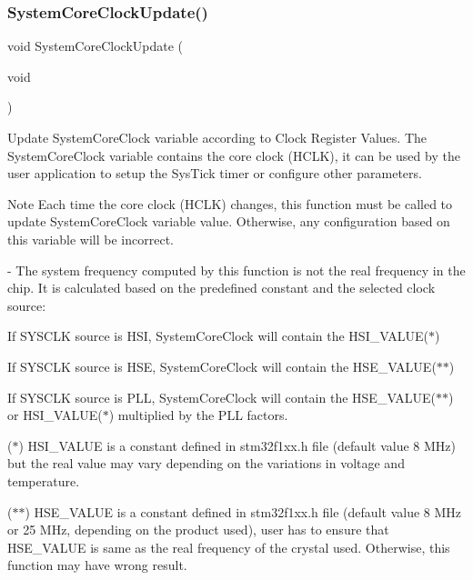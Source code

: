 \subsubsection{System\+Core\+Clock\+Update()}
{\footnotesize\ttfamily void System\+Core\+Clock\+Update (\begin{DoxyParamCaption}\item[{void}]{ }\end{DoxyParamCaption})}



Update System\+Core\+Clock variable according to Clock Register Values. The System\+Core\+Clock variable contains the core clock (H\+C\+LK), it can be used by the user application to setup the Sys\+Tick timer or configure other parameters. 

\begin{DoxyNote}{Note}
Each time the core clock (H\+C\+LK) changes, this function must be called to update System\+Core\+Clock variable value. Otherwise, any configuration based on this variable will be incorrect.

-\/ The system frequency computed by this function is not the real frequency in the chip. It is calculated based on the predefined constant and the selected clock source\+:
\end{DoxyNote}

\begin{DoxyItemize}
\item If S\+Y\+S\+C\+LK source is H\+SI, System\+Core\+Clock will contain the H\+S\+I\+\_\+\+V\+A\+L\+U\+E($\ast$)
\item If S\+Y\+S\+C\+LK source is H\+SE, System\+Core\+Clock will contain the H\+S\+E\+\_\+\+V\+A\+L\+U\+E($\ast$$\ast$)
\item If S\+Y\+S\+C\+LK source is P\+LL, System\+Core\+Clock will contain the H\+S\+E\+\_\+\+V\+A\+L\+U\+E($\ast$$\ast$) or H\+S\+I\+\_\+\+V\+A\+L\+U\+E($\ast$) multiplied by the P\+LL factors.
\end{DoxyItemize}

($\ast$) H\+S\+I\+\_\+\+V\+A\+L\+UE is a constant defined in stm32f1xx.\+h file (default value 8 M\+Hz) but the real value may vary depending on the variations in voltage and temperature.

($\ast$$\ast$) H\+S\+E\+\_\+\+V\+A\+L\+UE is a constant defined in stm32f1xx.\+h file (default value 8 M\+Hz or 25 M\+Hz, depending on the product used), user has to ensure that H\+S\+E\+\_\+\+V\+A\+L\+UE is same as the real frequency of the crystal used. Otherwise, this function may have wrong result.


